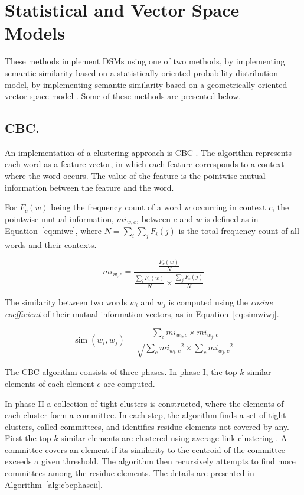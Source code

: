 \section{Statistical and Vector Space Models}

These methods implement \acp{DSM} using one of two methods, by implementing
semantic similarity based on a statistically oriented probability distribution
model, by implementing semantic similarity based on a geometrically oriented
vector space model \cite{van2010mining}. Some of these methods are presented
below.

\subsection{CBC.}

An implementation of a clustering approach is \ac{CBC}
\cite{pantel2003clustering,pantel2002discovering}. The algorithm represents each
word as a feature vector, in which each feature corresponds to a context where
the word occurs. The value of the feature is the pointwise mutual information
between the feature and the word.

For $F_c(w)$ being the frequency count of a word $w$ occurring in context $c$,
the pointwise mutual information, $mi_{w,c}$, between $c$ and $w$ is defined as
in Equation~\ref{eq:miwc}, where $N = \sum_i\sum_jF_i(j)$ is the total
frequency count of all words and their contexts.

\begin{equation}
 mi_{w,c} = \frac{\frac{F_c(w)}{N}}
                 {\frac{\sum_iF_i(w)}{N} \times
                  \frac{\sum_jF_c(j)}{N}}
 \label{eq:miwc}
\end{equation}

The similarity between two words $w_i$ and $w_j$ is computed using the
\textit{cosine coefficient} of their mutual information vectors, as in
Equation~\ref{eq:simwiwj}.

\begin{equation}
 \operatorname{sim}(w_i,w_j) = \frac{\sum_c mi_{w_i,c} \times mi_{w_j,c}}
                     {\sqrt{\sum_c{mi_{w_i,c}}^2 \times \sum_c{mi_{w_j,c}}^2}}
 \label{eq:simwiwj}
\end{equation}

The \ac{CBC} algorithm consists of three phases. In phase I, the top-$k$
similar elements of each element $e$ are computed.

In phase II a collection of tight clusters is constructed, where the
elements of each cluster form a committee. In each step, the algorithm finds a
set of tight clusters, called committees, and identifies residue elements not
covered by any. First the top-$k$ similar elements are clustered using
average-link clustering \cite{han2000data}. A committee covers an element if
its similarity to the centroid of the committee exceeds a given threshold. The
algorithm then recursively attempts to find more committees among the residue
elements. The details are presented in Algorithm~\ref{alg:cbcphaseii}.

